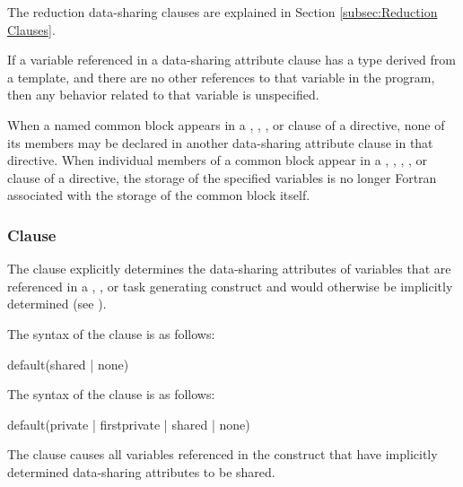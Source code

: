 {{{{The reduction data-sharing clauses are explained in Section \ref{subsec:Reduction Clauses}.

\cppspecificstart
If a variable referenced in a data-sharing attribute clause has a type derived from a 
template, and there are no other references to that variable in the program, then any 
behavior related to that variable is unspecified. 
\cppspecificend

\fortranspecificstart
When a named common block appears in a , , 
, or  clause of a directive, none of its members may be declared 
in another data-sharing attribute clause in that directive. When individual members of a common block appear in a , , 
, , or  clause of a directive, the storage of the specified variables is no longer Fortran associated with the storage of the common block itself.
\fortranspecificend










\subsubsection{ Clause}
\label{subsubsec:default clause}
\summary
The  clause explicitly determines the data-sharing attributes of variables that 
are referenced in a , , or task generating construct
and would otherwise be implicitly determined (see
).

\syntax
\ccppspecificstart
The syntax of the  clause is as follows:

\begin{boxedcode}
default(shared \textnormal{|} none)
\end{boxedcode}
\ccppspecificend

\fortranspecificstart
The syntax of the  clause is as follows:

\begin{boxedcode}
default(private \textnormal{|} firstprivate \textnormal{|} shared \textnormal{|} none)
\end{boxedcode}
\fortranspecificend

\descr
The  clause causes all variables referenced in the construct that 
have implicitly determined data-sharing attributes to be shared.

}}}}
